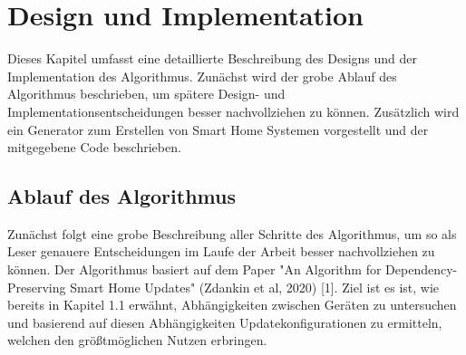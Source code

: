 \chapter{Design und Implementation}\label{ch:eval}

Dieses Kapitel umfasst eine detaillierte Beschreibung des Designs und der Implementation des Algorithmus. Zunächst wird der grobe
Ablauf des Algorithmus beschrieben, um spätere Design- und Implementationsentscheidungen besser nachvollziehen zu können.
Zusätzlich wird ein Generator zum Erstellen von Smart Home Systemen vorgestellt und der mitgegebene Code beschrieben.


\section{Ablauf des Algorithmus}
Zunächst folgt eine grobe Beschreibung aller Schritte des Algorithmus, um so als Leser genauere Entscheidungen im Laufe der Arbeit
besser nachvollziehen zu können. Der Algorithmus basiert auf dem Paper "An Algorithm for Dependency-Preserving Smart
Home Updates" (Zdankin et al, 2020) [1]. Ziel ist es
ist, wie bereits in Kapitel 1.1 erwähnt, Abhängigkeiten zwischen Geräten zu untersuchen und basierend auf diesen Abhängigkeiten
Updatekonfigurationen zu ermitteln, welchen den größtmöglichen Nutzen erbringen. 
